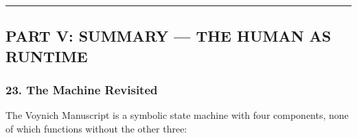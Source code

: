 \begin{center}\rule{0.5\linewidth}{0.5pt}\end{center}

\hypertarget{part-v-summary-the-human-as-runtime}{%
\subsection{PART V: SUMMARY --- THE HUMAN AS
RUNTIME}\label{part-v-summary-the-human-as-runtime}}

\hypertarget{the-machine-revisited}{%
\subsubsection{23. The Machine Revisited}\label{the-machine-revisited}}

The Voynich Manuscript is a symbolic state machine with four components,
none of which functions without the other three:

